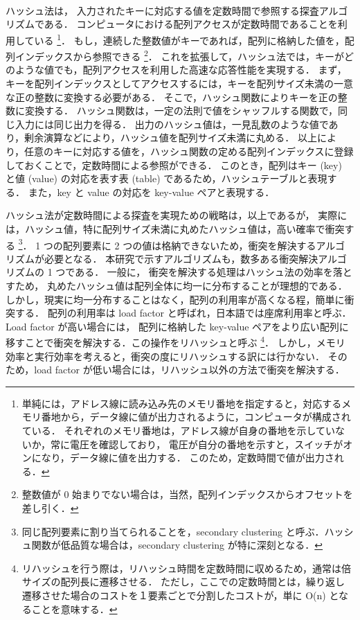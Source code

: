 \thispagestyle{empty} %

　\\
\\
\\
\\
\\
\\
\\
\\

ハッシュ法は，
入力されたキーに対応する値を定数時間で参照する探査アルゴリズムである．
コンピュータにおける配列アクセスが定数時間であることを利用している
\footnote{
単純には，アドレス線に読み込み先のメモリ番地を指定すると，対応するメモリ番地から，データ線に値が出力されるように，コンピュータが構成されている．
それぞれのメモリ番地は，アドレス線が自身の番地を示していないか，常に電圧を確認しており，
電圧が自分の番地を示すと，スイッチがオンになり，データ線に値を出力する．
このため，定数時間で値が出力される．
}．
もし，連続した整数値がキーであれば，配列に格納した値を，配列インデックスから参照できる
\footnote{
整数値が 0 始まりでない場合は，当然，配列インデックスからオフセットを差し引く．
}．
これを拡張して，ハッシュ法では，キーがどのような値でも，配列アクセスを利用した高速な応答性能を実現する．
まず，キーを配列インデックスとしてアクセスするには，キーを配列サイズ未満の一意な正の整数に変換する必要がある．
そこで，ハッシュ関数によりキーを正の整数に変換する．
ハッシュ関数は，一定の法則で値をシャッフルする関数で，同じ入力には同じ出力を得る．
出力のハッシュ値は，一見乱数のような値であり，剰余演算などにより，ハッシュ値を配列サイズ未満に丸める．
以上により，任意のキーに対応する値を，ハッシュ関数の定める配列インデックスに登録しておくことで，定数時間による参照ができる．
このとき，配列はキー (key) と値 (value) の対応を表す表 (table) であるため，ハッシュテーブルと表現する．
また，key と value の対応を key-value ペアと表現する．

ハッシュ法が定数時間による探査を実現ための戦略は，以上であるが，
実際には，ハッシュ値，特に配列サイズ未満に丸めたハッシュ値は，高い確率で衝突する
\footnote{
同じ配列要素に割り当てられることを，secondary clustering と呼ぶ．ハッシュ関数が低品質な場合は，secondary clustering が特に深刻となる．
}．
1 つの配列要素に 2 つの値は格納できないため，衝突を解決するアルゴリズムが必要となる．
本研究で示すアルゴリズムも，数多ある衝突解決アルゴリズムの 1 つである．
一般に，
衝突を解決する処理はハッシュ法の効率を落とすため，
丸めたハッシュ値は配列全体に均一に分布することが理想的である．
しかし，現実に均一分布することはなく，配列の利用率が高くなる程，簡単に衝突する．
配列の利用率は load factor と呼ばれ，日本語では座席利用率と呼ぶ．
Load factor が高い場合には，
配列に格納した key-value ペアをより広い配列に移すことで衝突を解決する．この操作をリハッシュと呼ぶ
\footnote{
リハッシュを行う際は，リハッシュ時間を定数時間に収めるため，通常は倍サイズの配列長に遷移させる．
ただし，ここでの定数時間とは，繰り返し遷移させた場合のコストを１要素ごとで分割したコストが，単に O(n) となることを意味する．
}．
しかし，メモリ効率と実行効率を考えると，衝突の度にリハッシュする訳には行かない．
そのため，load factor が低い場合には，リハッシュ以外の方法で衝突を解決する．

